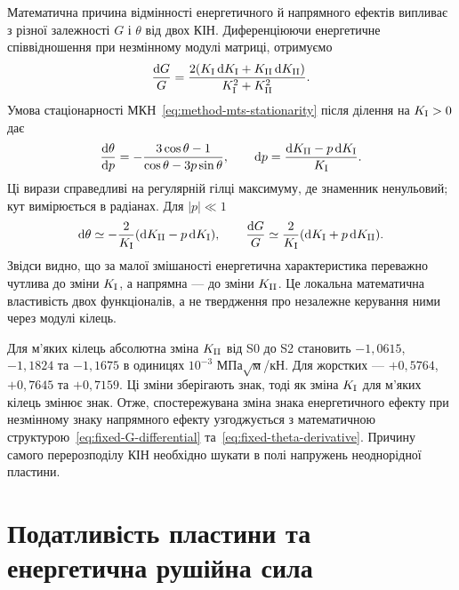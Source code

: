 Математична причина відмінності енергетичного й напрямного ефектів випливає з різної залежності $G$ і $\theta$ від двох КІН. Диференціюючи енергетичне співвідношення при незмінному модулі матриці, отримуємо
\begin{equation}
 \frac{\mathrm dG}{G}=
 \frac{2(K_{\mathrm{I}}\,\mathrm dK_{\mathrm{I}}+K_{\mathrm{II}}\,\mathrm dK_{\mathrm{II}})}
 {K_{\mathrm{I}}^2+K_{\mathrm{II}}^2}.
 \label{eq:fixed-G-differential}
\end{equation}
Умова стаціонарності МКН~\eqref{eq:method-mts-stationarity} після ділення на $K_{\mathrm{I}}>0$ дає
\begin{equation}
 \frac{\mathrm d\theta}{\mathrm dp}
 =-\frac{3\cos\theta-1}
 {\cos\theta-3p\sin\theta},\qquad
 \mathrm dp=\frac{\mathrm dK_{\mathrm{II}}-p\,\mathrm dK_{\mathrm{I}}}{K_{\mathrm{I}}}.
 \label{eq:fixed-theta-derivative}
\end{equation}
Ці вирази справедливі на регулярній гілці максимуму, де знаменник ненульовий; кут вимірюється в радіанах. Для $|p|\ll1$
\begin{equation}
 \mathrm d\theta\simeq
 -\frac{2}{K_{\mathrm{I}}}(\mathrm dK_{\mathrm{II}}-p\,\mathrm dK_{\mathrm{I}}),\qquad
 \frac{\mathrm dG}{G}\simeq
 \frac{2}{K_{\mathrm{I}}}(\mathrm dK_{\mathrm{I}}+p\,\mathrm dK_{\mathrm{II}}).
 \label{eq:fixed-small-mixity}
\end{equation}
Звідси видно, що за малої змішаності енергетична характеристика переважно чутлива до зміни $K_{\mathrm{I}}$, а напрямна --- до зміни $K_{\mathrm{II}}$. Це локальна математична властивість двох функціоналів, а не твердження про незалежне керування ними через модулі кілець.

Для м'яких кілець абсолютна зміна $K_{\mathrm{II}}$ від S0 до S2 становить $-1{,}0615$, $-1{,}1824$ та $-1{,}1675$ в одиницях $10^{-3}$ МПа$\sqrt{\text{м}}$/кН. Для жорстких --- $+0{,}5764$, $+0{,}7645$ та $+0{,}7159$. Ці зміни зберігають знак, тоді як зміна $K_{\mathrm{I}}$ для м'яких кілець змінює знак. Отже, спостережувана зміна знака енергетичного ефекту при незмінному знаку напрямного ефекту узгоджується з математичною структурою~\eqref{eq:fixed-G-differential} та~\eqref{eq:fixed-theta-derivative}. Причину самого перерозподілу КІН необхідно шукати в полі напружень неоднорідної пластини.

\section{Податливість пластини та енергетична рушійна сила}
\label{sec:fixed-compliance}

